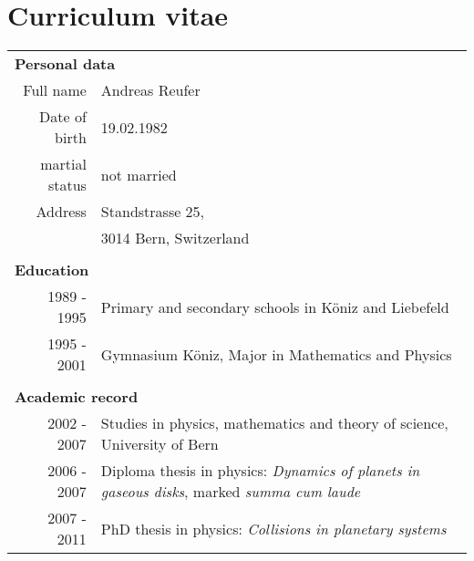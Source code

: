 

\cleardoublepage
\chapter*{Curriculum vitae}

\begin{tabular}{r p{12.0cm}}
\multicolumn{2}{l}{ {\large \bf Personal data} } \\
Full name & Andreas Reufer\\
Date of birth & 19.02.1982\\
martial status & not married \\
Address & Standstrasse 25, \\
 & 3014 Bern, Switzerland \\
\\
\multicolumn{2}{l}{ {\large \bf Education} } \\
1989 - 1995 & Primary and secondary schools in Köniz and Liebefeld\\
1995 - 2001 & Gymnasium Köniz, Major in Mathematics and Physics\\
\\
\multicolumn{2}{l}{ {\large \bf Academic record} } \\
2002 - 2007 & Studies in physics, mathematics and theory of science, University of Bern \\
2006 - 2007 & Diploma thesis in physics: \emph{Dynamics of planets in gaseous disks}, marked \emph{summa cum laude} \\
2007 - 2011 & PhD thesis in physics: \emph{Collisions in planetary systems} \\
\end{tabular}

